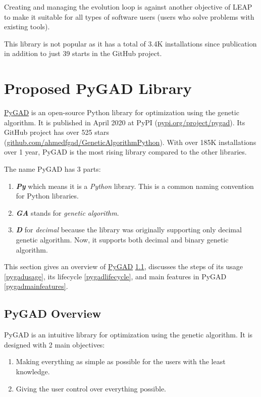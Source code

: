 \documentclass[conference]{IEEEtran}
\begin{document}
Creating and managing the evolution loop is against another objective of LEAP to make it suitable for all types of software users (users who solve problems with existing tools).  

This library is not popular as it has a total of 3.4K installations since publication in addition to just 39 starts in the GitHub project. 

\section{Proposed PyGAD Library}
\label{proposedlibrary}

\href{https://pygad.readthedocs.io}{PyGAD} is an open-source Python library for optimization using the genetic algorithm. It is published in April 2020 at PyPI (\href{https://pypi.org/project/pygad}{pypi.org/project/pygad}). Its GitHub project has over 525 stars (\href{https://github.com/ahmedfgad/GeneticAlgorithmPython}{github.com/ahmedfgad/GeneticAlgorithmPython}). With over 185K installations over 1 year, PyGAD is the most rising library compared to the other libraries. 

The name PyGAD has 3 parts:
\begin{enumerate}
  \item \textbf{\textit{Py}} which means it is a \textit{Python} library. This is a common naming convention for Python libraries.
  \item \textbf{\textit{GA}} stands for \textit{genetic algorithm}.
  \item \textbf{\textit{D}} for \textit{decimal} because the library was originally supporting only decimal genetic algorithm. Now, it supports both decimal and binary genetic algorithm.
\end{enumerate}

This section gives an overview of \href{https://pygad.readthedocs.io}{PyGAD} \ref{pygadoverview}, discusses the steps of its usage \ref{pygadusage}, its lifecycle \ref{pygadlifecycle}, and main features in PyGAD \ref{pygadmainfeatures}. 

\subsection{PyGAD Overview}
\label{pygadoverview}

PyGAD is an intuitive library for optimization using the genetic algorithm. It is designed with 2 main objectives:
\begin{enumerate}
    \item Making everything as simple as possible for the users with the least knowledge.
    \item Giving the user control over everything possible.
\end{enumerate}
\end{document}
